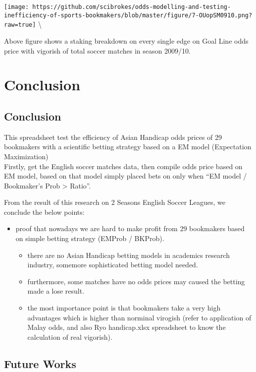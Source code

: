 \documentclass[article]{jss}
\providecommand{\tightlist}{%
  \setlength{\itemsep}{0pt}\setlength{\parskip}{0pt}}
\begin{document}
\texttt{[image: https://github.com/scibrokes/odds-modelling-and-testing-inefficiency-of-sports-bookmakers/blob/master/figure/7-OUopSM0910.png?raw=true]}
\textbackslash{}

Above figure shows a staking breakdown on every single edge on Goal Line
odds price with vigorish of total soccer matches in season 2009/10.

\section{Conclusion}\label{conclusion}

\subsection{Conclusion}\label{conclusion-1}

This spreadsheet test the efficiency of Asian Handicap odds prices of 29
bookmakers with a scientific betting strategy based on a EM model
(Expectation Maximization)\\
Firstly, get the English soccer matches data, then compile odds price
based on EM model, based on that model simply placed bets on only when
``EM model / Bookmaker's Prob \textgreater{} Ratio''. \bigbreak

From the result of this research on 2 Seasons English Soccer Leagues, we
conclude the below points:

\begin{itemize}
\tightlist
\item
  proof that nowadays we are hard to make profit from 29 bookmakers
  based on simple betting strategy (EMProb / BKProb).

  \begin{itemize}
  \tightlist
  \item
    there are no Asian Handicap betting models in academics research
    industry, somemore sophisticated betting model needed.
  \item
    furthermore, some matches have no odds prices may caused the betting
    made a lose result.
  \item
    the most importance point is that bookmakers take a very high
    advantages which is higher than norminal virogish (refer to
    application of Malay odds, and also Ryo handicap.xlsx spreadsheet to
    know the calculation of real vigorish).
  \end{itemize}
\end{itemize}

\subsection{Future Works}\label{future-works}
\end{document}
